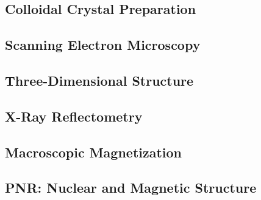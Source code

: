 \documentclass[\main/dresen_thesis.tex]{subfiles}
\renewcommand{\thisPath}{\main/chapters/colloidalCrystals/colloidalCrystals}
\begin{document}
  \subsection{Colloidal Crystal Preparation}
  
    \FloatBarrier

  \subsection{Scanning Electron Microscopy}
  
    \FloatBarrier

  \subsection{Three-Dimensional Structure}
  
    \FloatBarrier

  \subsection{X-Ray Reflectometry}
  
    \FloatBarrier

  \subsection{Macroscopic Magnetization}
  
    \FloatBarrier

  \subsection{PNR: Nuclear and Magnetic Structure}
  
    \FloatBarrier

\end{document}
